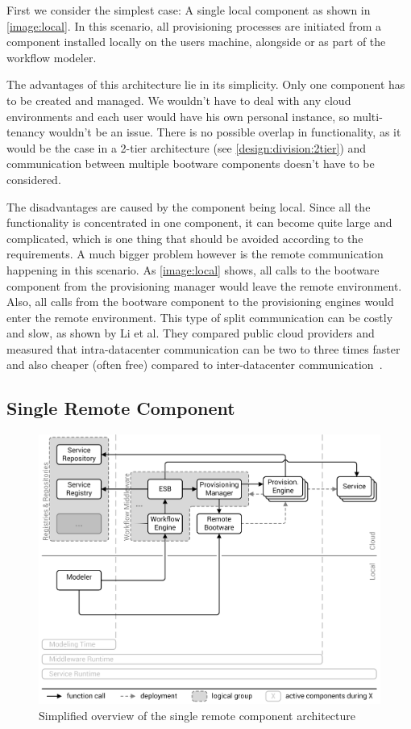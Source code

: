 First we consider the simplest case: A single local component as shown in \autoref{image:local}.
In this scenario, all provisioning processes are initiated from a component installed locally on the users machine, alongside or as part of the workflow modeler.

The advantages of this architecture lie in its simplicity.
Only one component has to be created and managed.
We wouldn't have to deal with any cloud environments and each user would have his own personal instance, so multi-tenancy wouldn't be an issue.
There is no possible overlap in functionality, as it would be the case in a 2-tier architecture (see \autoref{design:division:2tier}) and communication between multiple bootware components doesn't have to be considered.

The disadvantages are caused by the component being local.
Since all the functionality is concentrated in one component, it can become quite large and complicated, which is one thing that should be avoided according to the requirements.
A much bigger problem however is the remote communication happening in this scenario.
As \autoref{image:local} shows, all calls to the bootware component from the provisioning manager would leave the remote environment.
Also, all calls from the bootware component to the provisioning engines would enter the remote environment.
This type of split communication can be costly and slow, as shown by Li et al.
They compared public cloud providers and measured that intra-datacenter communication can be two to three times faster and also cheaper (often free) compared to inter-datacenter communication~\autocite{cloudcmp}.

\subsection{Single Remote Component}

\begin{figure}[!htbp]
	\centering
	\includegraphics[resolution=600]{design/assets/remote}
	\caption{Simplified overview of the single remote component architecture}
	\label{image:remote}
\end{figure}


